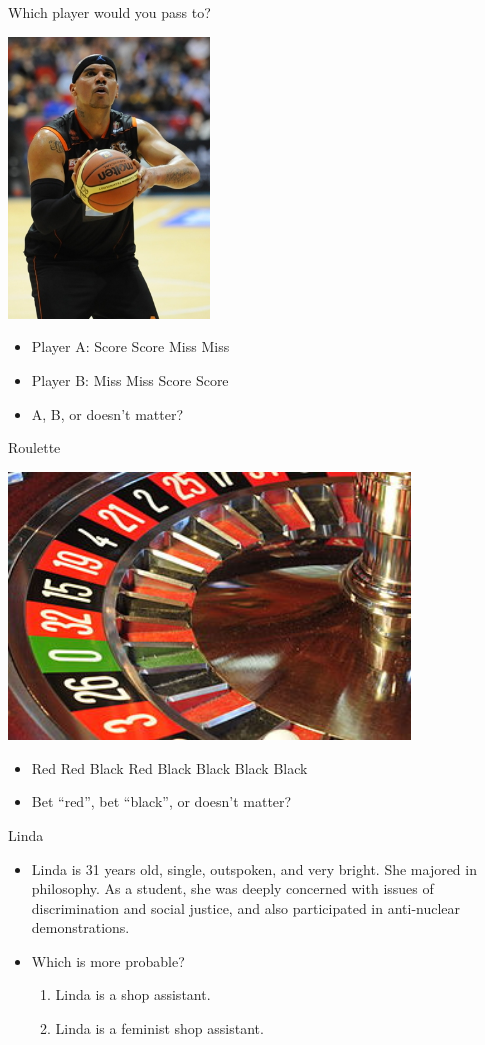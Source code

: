 \documentclass{beamer}
\begin{document}
\begin{frame}{Which player would you pass to?}
\centerline{\includegraphics[width=0.4\textwidth]{pics/basketball.jpg}}
\begin{itemize}
\item Player A: Score Score Miss Miss
\item Player B: Miss Miss Score Score
\item A, B, or doesn't matter?
\end{itemize}
\end{frame}

\begin{frame}{Roulette}
\centerline{\includegraphics[width=0.8\textwidth]{pics/roulette.jpg}}
\begin{itemize}
\item Red Red Black Red Black Black Black Black 
\item Bet ``red'', bet ``black'', or doesn't matter?
\end{itemize}
\end{frame}

\begin{frame}{Linda}
\begin{itemize}
\item Linda is 31 years old, single, outspoken, and very bright. She majored in
  philosophy. As a student, she was deeply concerned with issues of
  discrimination and social justice, and also participated in anti-nuclear
  demonstrations.
\item Which is more probable?
\begin{enumerate}
\item Linda is a shop assistant.
\item Linda is a feminist shop assistant.
\end{enumerate}
\end{itemize}
\end{frame}
\end{document}

